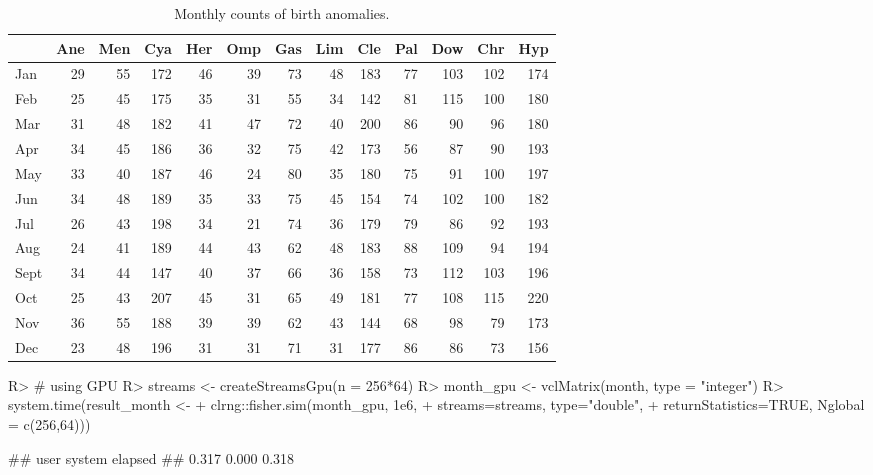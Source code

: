 \documentclass[article,nojss]{jss}\usepackage[]{graphicx}\usepackage[]{color}
\begin{document}
\begin{table}

\caption{\label{tab:monthdata}Monthly counts of birth anomalies.\label{tab:month}}
\centering
\begin{tabular}[t]{lrrrrrrrrrrrr}
\toprule
  & Ane & Men & Cya & Her & Omp & Gas & Lim & Cle & Pal & Dow & Chr & Hyp\\
\midrule
Jan & 29 & 55 & 172 & 46 & 39 & 73 & 48 & 183 & 77 & 103 & 102 & 174\\
Feb & 25 & 45 & 175 & 35 & 31 & 55 & 34 & 142 & 81 & 115 & 100 & 180\\
Mar & 31 & 48 & 182 & 41 & 47 & 72 & 40 & 200 & 86 & 90 & 96 & 180\\
Apr & 34 & 45 & 186 & 36 & 32 & 75 & 42 & 173 & 56 & 87 & 90 & 193\\
May & 33 & 40 & 187 & 46 & 24 & 80 & 35 & 180 & 75 & 91 & 100 & 197\\
Jun & 34 & 48 & 189 & 35 & 33 & 75 & 45 & 154 & 74 & 102 & 100 & 182\\
Jul & 26 & 43 & 198 & 34 & 21 & 74 & 36 & 179 & 79 & 86 & 92 & 193\\
Aug & 24 & 41 & 189 & 44 & 43 & 62 & 48 & 183 & 88 & 109 & 94 & 194\\
Sept & 34 & 44 & 147 & 40 & 37 & 66 & 36 & 158 & 73 & 112 & 103 & 196\\
Oct & 25 & 43 & 207 & 45 & 31 & 65 & 49 & 181 & 77 & 108 & 115 & 220\\
Nov & 36 & 55 & 188 & 39 & 39 & 62 & 43 & 144 & 68 & 98 & 79 & 173\\
Dec & 23 & 48 & 196 & 31 & 31 & 71 & 31 & 177 & 86 & 86 & 73 & 156\\
\bottomrule
\end{tabular}
\end{table}





\begin{CodeChunk}
\begin{CodeInput}
R> # using GPU
R> streams <- createStreamsGpu(n = 256*64)
R> month_gpu <- vclMatrix(month, type = "integer")
R> system.time(result_month <- 
+  clrng::fisher.sim(month_gpu, 1e6, 
+     streams=streams, type="double", 
+     returnStatistics=TRUE,  Nglobal = c(256,64)))
\end{CodeInput}
\begin{CodeOutput}
##    user  system elapsed 
##   0.317   0.000   0.318
\end{CodeOutput} 
\end{CodeChunk} 
\end{document}
